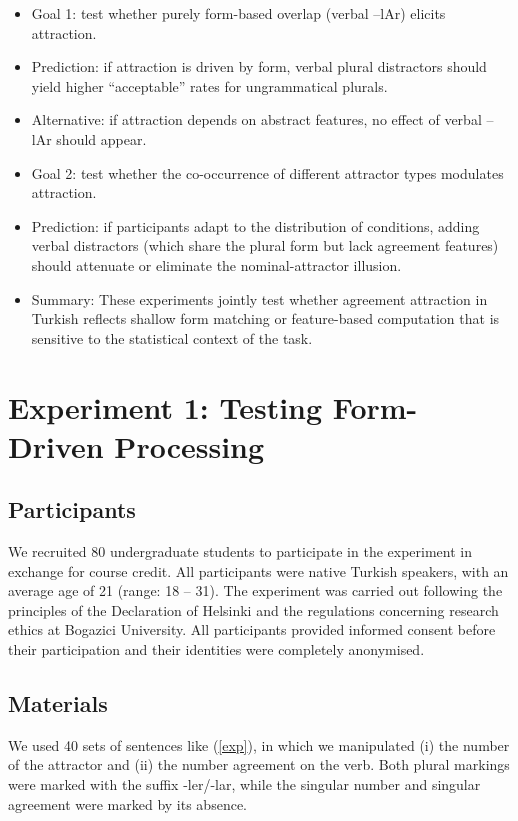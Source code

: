 \documentclass[
  authoryear,
  preprint]{elsarticle}
\begin{document}
\begin{itemize}
\item
  Goal 1: test whether purely form-based overlap (verbal --lAr) elicits
  attraction.
\item
  Prediction: if attraction is driven by form, verbal plural distractors
  should yield higher ``acceptable'' rates for ungrammatical plurals.
\item
  Alternative: if attraction depends on abstract features, no effect of
  verbal --lAr should appear.
\item
  Goal 2: test whether the co-occurrence of different attractor types
  modulates attraction.
\item
  Prediction: if participants adapt to the distribution of conditions,
  adding verbal distractors (which share the plural form but lack
  agreement features) should attenuate or eliminate the
  nominal-attractor illusion.
\item
  Summary: These experiments jointly test whether agreement attraction
  in Turkish reflects shallow form matching or feature-based computation
  that is sensitive to the statistical context of the task.
\end{itemize}

\section{Experiment 1: Testing Form-Driven
Processing}\label{experiment-1-testing-form-driven-processing}

\subsection{Participants}\label{participants}

We recruited 80 undergraduate students to participate in the experiment
in exchange for course credit. All participants were native Turkish
speakers, with an average age of 21 (range: 18 -- 31). The experiment
was carried out following the principles of the Declaration of Helsinki
and the regulations concerning research ethics at Bogazici University.
All participants provided informed consent before their participation
and their identities were completely anonymised.

\subsection{Materials}\label{materials}

We used 40 sets of sentences like (\ref{exp}), in which we manipulated
(i) the number of the attractor and (ii) the number agreement on the
verb. Both plural markings were marked with the suffix -ler/-lar, while
the singular number and singular agreement were marked by its absence.
\end{document}
